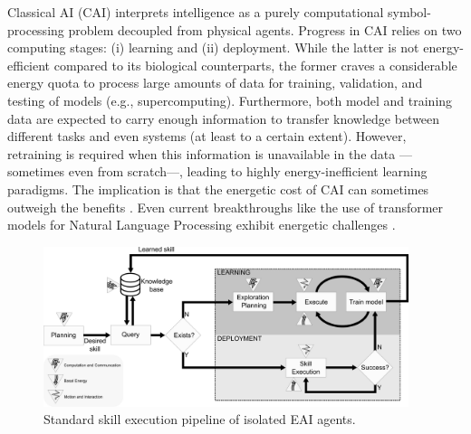 \documentclass[12pt]{article}
\begin{document}
Classical AI (CAI) interprets intelligence as a purely computational symbol-processing problem decoupled from physical agents. Progress in CAI relies on two computing stages: (i) learning and (ii) deployment. While the latter is not energy-efficient compared to its biological counterparts, the former craves a considerable energy quota to process large amounts of data for training, validation, and testing of models (e.g., supercomputing). Furthermore, both model and training data are expected to carry enough information to transfer knowledge between different tasks and even systems (at least to a certain extent). However, retraining is required when this information is unavailable in the data ---sometimes even from scratch---, leading to highly energy-inefficient learning paradigms. The implication is that the energetic cost of CAI can sometimes outweigh the benefits \cite{Strubell2019EnergyPolicyConsiderations}. Even current breakthroughs like the use of transformer models for Natural Language Processing exhibit energetic challenges \cite{Cao2020TowardsAccurateReliable}.
\begin{figure}[!t]
	\centering
	\includegraphics[width=0.95\textwidth]{fig/embodied_ai_learning_pipeline_v7.png}
	\caption{Standard skill execution pipeline of isolated EAI agents.}
	\label{fig:embodied_ai_pipeline}
\end{figure}
\end{document}
